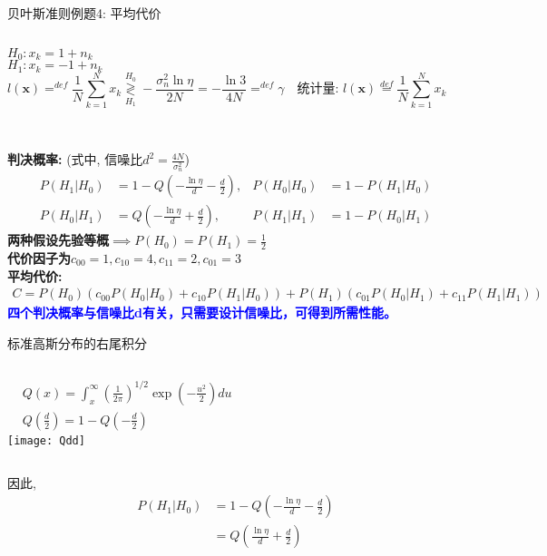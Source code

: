\begin{frame}[shrink]{贝叶斯准则例题4: 平均代价}
\begin{columns}
	$H_0:x_k=1+n_k$\\
	$H_1:x_k=-1+n_k$
	\[
	l(\bm{x})\mathop{=}^{def}\frac{1}{N}\sum\limits_{k=1}^{N}x_k\mathop{\gtrless}\limits_{H_1}^{H_0}-\frac{\sigma_n^2\ln\eta}{2N}=-\frac{\ln3}{4N}\mathop{=}^{def}\gamma \quad \textbf{统计量: }l(\bm{x})\mathop{=}\limits^{def}\frac{1}{N}\sum\limits_{k=1}^{N}x_k
	\]
\end{columns}
~\\
\textbf{判决概率:} (式中, 信噪比$d^2=\frac{4N}{\sigma_n^2}$)
\begin{align*}
P(H_1|H_0)&=1-Q\left(-\frac{\ln\eta}{d}-\frac{d}{2}\right), &P(H_0|H_0)&=1-P(H_1|H_0)\\
P(H_0|H_1)&=Q\left(-\frac{\ln\eta}{d}+\frac{d}{2}\right),
&P(H_1|H_1)&=1-P(H_0|H_1)
\end{align*}
\textbf{两种假设先验等概$\implies P(H_0)=P(H_1)=\frac{1}{2}$}\\
\textbf{代价因子为$c_{00}=1, c_{10}=4, c_{11}=2, c_{01}=3$}\\
\textbf{平均代价:}
\begin{align*}
C=P(H_0)(c_{00}P(H_0|H_0)+c_{10}P(H_1|H_0))+P(H_1)(c_{01}P(H_0|H_1)+c_{11}P(H_1|H_1))
\end{align*}
\textbf{\textcolor{blue}{四个判决概率与信噪比d有关，只需要设计信噪比，可得到所需性能。}}
\end{frame}

\begin{frame}[shrink]{标准高斯分布的右尾积分}
\begin{columns}
	\begin{align*}
	&Q(x)=\int_{x}^{\infty}\left(\frac{1}{2\pi}\right)^{1/2}\exp\left(-\frac{u^2}{2}\right)du\\
	&Q\left(\frac{d}{2}\right) = 1-Q\left(-\frac{d}{2}\right)
	\end{align*}
	\centering
	\texttt{[image: Qdd]}
\end{columns}
因此, 
\begin{align*}
P(H_1|H_0)&=1-Q\left(-\frac{\ln\eta}{d}-\frac{d}{2}\right)\\
&=Q\left(\frac{\ln\eta}{d}+\frac{d}{2}\right)
\end{align*}
\end{frame}





